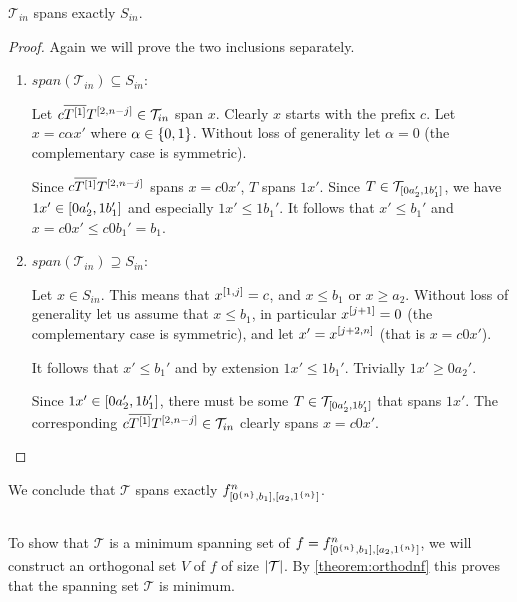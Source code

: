\begin{lemma}
$\mathcal{T}_{in}$ spans exactly $S_{in}$.
\end{lemma}

\begin{proof}
Again
we will prove the two inclusions separately.
\begin{enumerate}
\item $span(\mathcal{T}_{in}) \subseteq S_{in}$:

Let $c \overline{T^{[1]}} T^{[2, n-j]} \in \mathcal{T}_{in}$ span $x$.
Clearly $x$ starts with the prefix $c$.
Let $x = c \alpha x'$ where $\alpha \in \{0, 1\}$.
Without loss of generality let $\alpha = 0$
(the complementary case is symmetric).

Since $c \overline{T^{[1]}} T^{[2, n-j]}$ spans
$x = c 0 x'$,
$T$ spans $1 x'$.
Since
$T \in \mathcal{T}_{[0 a_2', 1 b_1']}$,
we have $1 x' \in [0 a_2', 1 b_1']$
and especially $1 x' \leq 1 b_1'$.
It follows that $x' \leq b_1'$
and $x = c 0 x' \leq c 0 b_1' = b_1$.

\item $span(\mathcal{T}_{in}) \supseteq S_{in}$:

Let $x \in S_{in}$.
This means that $x^{[1, j]} = c$,
and $x \leq b_1$ or $x \geq a_2$.
Without loss of generality let
us assume that $x \leq b_1$,
in particular
$x^{[j+1]} = 0$
(the complementary case is symmetric),
and let $x' = x^{[j+2, n]}$
(that is $x = c 0 x'$).

It follows that $x'\leq b_1'$
and by extension $1 x' \leq 1 b_1'$.
Trivially $1 x' \geq 0 a_2'$.

Since $1 x' \in [0 a_2', 1 b_1']$,
there must be some
$T \in \mathcal{T}_{[0 a_2', 1 b_1']}$
that spans $1 x'$.
The corresponding
$c \overline{T^{[1]}} T^{[2, n-j]}
\in \mathcal{T}_{in}$ clearly spans $x = c 0 x'$.
\end{enumerate}
\end{proof}

We conclude that $\mathcal{T}$ spans exactly $f^{n}_{[0^{\{n\}}, b_1], [a_2, 1^{\{n\}}]}$.

\subsection{\titleoptimality}

To show that $\mathcal{T}$
is a minimum spanning set of $f = f^{n}_{[0^{\{n\}}, b_1], [a_2, 1^{\{n\}}]}$,
we will construct an orthogonal set $V$ of $f$
of size $\lvert\mathcal{T}\rvert$.
By \cref{theorem:orthodnf} this proves
that the spanning set $\mathcal{T}$ is minimum.

